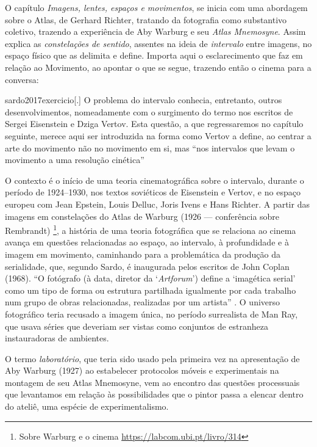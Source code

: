 O capítulo \emph{Imagens, lentes, espaços e movimentos}, se inicia com
uma abordagem sobre o Atlas, de Gerhard Richter, tratando da fotografia
como substantivo coletivo, trazendo a experiência de Aby Warburg e seu
\emph{Atlas Mnemosyne}. Assim \textcite{sardo2017exercicio} explica as
\emph{constelações de sentido}, assentes na ideia de \emph{intervalo}
entre imagens, no espaço físico que as delimita e define. Importa aqui
o esclarecimento que \textcite{sardo2017exercicio} faz em relação ao
Movimento, ao apontar o que se segue, trazendo então o cinema para a
conversa:

\begin{displaycquote}[232]{sardo2017exercicio}[.]
	O problema do intervalo conhecia, entretanto, outros desenvolvimentos,
	nomeadamente com o surgimento do termo nos escritos de Sergei Eisenstein
	e Dziga Vertov. Esta questão, a que regressaremos no capítulo seguinte,
	merece aqui ser introduzida na forma como Vertov a define, ao centrar a
	arte do movimento não no movimento em si, mas \enquote{nos intervalos que levam
		o movimento a uma resolução cinética}
\end{displaycquote}

O contexto é o início de uma teoria cinematográfica sobre o intervalo,
durante o período de 1924--1930, nos textos soviéticos de Eisenstein e
Vertov, e no espaço europeu com Jean Epstein, Louis Delluc, Joris Ivens
e Hans Richter. A partir das imagens em constelações do Atlas de
Warburg (1926 --- conferência sobre Rembrandt) \footnote{Sobre Warburg
	e o cinema \url{https://labcom.ubi.pt/livro/314}}, a história de uma
teoria fotográfica que se relaciona ao cinema avança em questões
relacionadas ao espaço, ao intervalo, à profundidade e à imagem em
movimento, caminhando para a problemática da produção da serialidade,
que, segundo Sardo, é inaugurada pelos escritos de John Coplan (1968).
\enquote{O fotógrafo (à data, diretor da \enquote{\emph{Artforum}})
	define a \enquote{imagética serial} como um tipo de forma ou estrutura
	partilhada igualmente por cada trabalho num grupo de obras
	relacionadas, realizadas por um artista}
\parencite[233]{sardo2017exercicio}. O universo fotográfico teria recusado
a imagem única, no período surrealista de Man Ray, que usava séries que
deveriam ser vistas como conjuntos de estranheza instauradoras de
ambientes.


O termo \emph{laboratório}, que teria sido usado pela primeira vez na
apresentação de Aby Warburg (1927) ao estabelecer protocolos móveis e
experimentais na montagem de seu Atlas Mnemosyne, vem ao encontro das
questões processuais que levantamos em relação às possibilidades que o
pintor passa a elencar dentro do ateliê, uma espécie de
experimentalismo.

